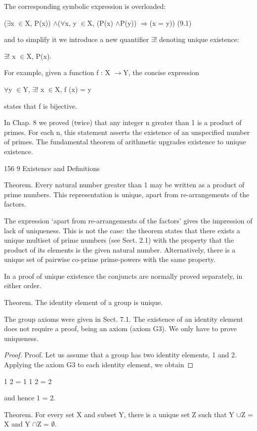 \documentclass[11pt]{article}
\theoremstyle{plain}
\theoremstyle{definition}
\begin{document}
The corresponding symbolic expression is overloaded:

($\exists$x $\in$X, P(x)) $\land$($\forall$x, y $\in$X, (P(x) $\land$P(y)) $\Rightarrow$(x = y)) (9.1)

and to simplify it we introduce a new quantifier $\exists$! denoting unique existence:

$\exists$! x $\in$X, P(x).

For example, given a function f : X $\to$Y, the concise expression

$\forall$y $\in$Y, $\exists$! x $\in$X, f (x) = y

states that f is bijective.

In Chap. 8 we proved (twice) that any integer n greater than 1 is a product of primes. For each n, this statement asserts the existence of an unspecified number of primes. The fundamental theorem of arithmetic upgrades existence to unique existence.

156 9 Existence and Definitions

Theorem. Every natural number greater than 1 may be written as a product of prime numbers. This representation is unique, apart from re-arrangements of the factors.

The expression `apart from re-arrangements of the factors' gives the impression of lack of uniqueness. This is not the case: the theorem states that there exists a unique multiset of prime numbers (see Sect. 2.1) with the property that the product of its elements is the given natural number. Alternatively, there is a unique set of pairwise co-prime prime-powers with the same property.

In a proof of unique existence the conjuncts are normally proved separately, in either order.

Theorem. The identity element of a group is unique.

The group axioms were given in Sect. 7.1. The existence of an identity element does not require a proof, being an axiom (axiom G3). We only have to prove uniqueness.

\begin{proof}
Proof. Let us assume that a group has two identity elements, 1 and 2. Applying the axiom G3 to each identity element, we obtain
\end{proof}

1 2 = 1 1 2 = 2

and hence 1 = 2. 

Theorem. For every set X and subset Y, there is a unique set Z such that Y $\cup$Z = X and Y $\cap$Z = $\emptyset$.
\end{document}
